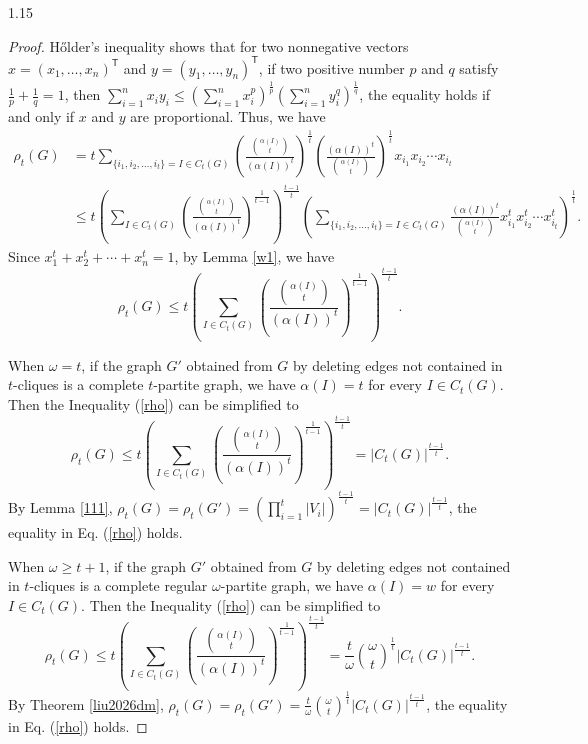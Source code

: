 \documentclass[preprint,12pt]{elsarticle1}
\numberwithin{equation}{section}
\begin{document}
\begin{spacing}{1.15}
\begin{proof}
H\H{o}lder's inequality shows that for two nonnegative vectors $x=(x_1,\ldots,x_n)^{\mathsf{T}}$ and $y=(y_1,\ldots,y_n)^{\mathsf{T}}$, if two positive number $p$ and $q$ satisfy $\frac{1}{p}+\frac{1}{q}=1$, then $\sum_{i=1}^{n}x_i y_i\le \left(\sum_{i=1}^{n}x_i^p\right)^{\frac{1}{p}}\left(\sum_{i=1}^{n}y_i^q\right)^{\frac{1}{q}}$,
the equality holds if and only if $x$ and $y$ are proportional.
Thus, we have
\begin{align*}
\rho_{t}(G)&=t \sum_{\{i_1,i_2,\ldots,i_t\}=I\in C_t(G)} \left(\frac{\binom{\alpha(I)}{t}}{\left(\alpha(I)\right)^t}\right)^{\frac{1}{t}} \left(\frac{\left(\alpha(I)\right)^t}{\binom{\alpha(I)}{t}}\right)^{\frac{1}{t}}x_{i_1} x_{i_2} \cdots x_{i_t}\\
&\le t \left(\sum_{I\in C_t(G)}\left(\frac{\binom{\alpha(I)}{t}}{\left(\alpha(I)\right)^t}\right)^{\frac{1}{t-1}}\right)^{\frac{t-1}{t}} \left(\sum_{\{i_1,i_2,\ldots,i_t\}=I\in C_t(G)}\frac{\left(\alpha(I)\right)^t}{\binom{\alpha(I)}{t}}x_{i_1}^{t} x_{i_2}^{t}\cdots x_{i_t}^{t}\right)^{\frac{1}{t}}.
\end{align*}
Since $x_1^t+x_2^t+\cdots+x_n^t=1$, by Lemma \ref{w1}, we have
\begin{equation}\label{rho}
\rho_{t}(G)\le t \left(\sum_{I\in C_t(G)}\left(\frac{\binom{\alpha(I)}{t}}{\left(\alpha(I)\right)^t}\right)^{\frac{1}{t-1}}\right)^{\frac{t-1}{t}}.
\end{equation}

When $\omega = t$, if the graph $G'$ obtained from $G$ by deleting edges not contained in $t$-cliques is a complete $t$-partite graph, we have $\alpha(I)=t$ for every $I\in C_{t}(G)$. Then the Inequality (\ref{rho}) can be simplified to $$\rho_{t}(G)\le t \left(\sum_{I\in C_t(G)}\left(\frac{\binom{\alpha(I)}{t}}{\left(\alpha(I)\right)^t}\right)^{\frac{1}{t-1}}\right)^{\frac{t-1}{t}}=|C_t(G)|^{\frac{t-1}{t}}.$$
By Lemma \ref{111}, $\rho_t(G)=\rho_t(G')=\left( \prod_{i=1}^{t}|V_i| \right)^{\frac{t-1}{t}}=|C_t(G)|^{\frac{t-1}{t}}$, the equality in Eq. (\ref{rho}) holds.

When $\omega \geq t+1$, if the graph $G'$ obtained from $G$ by deleting edges not contained in $t$-cliques is a complete regular $\omega$-partite graph, we have $\alpha(I)=w$ for every $I\in C_{t}(G)$. Then the Inequality (\ref{rho}) can be simplified to $$\rho_{t}(G)\le t \left(\sum_{I\in C_t(G)}\left(\frac{\binom{\alpha(I)}{t}}{\left(\alpha(I)\right)^t}\right)^{\frac{1}{t-1}}\right)^{\frac{t-1}{t}}
=\frac{t}{\omega}\binom{\omega}{t}^{\frac{1}{t}}|C_{t}(G)|^{\frac{t-1}{t}}.$$ By Theorem \ref{liu2026dm}, $\rho_t(G)=\rho_t(G')=\frac{t}{\omega}\binom{\omega}{t}^{\frac{1}{t}}|C_{t}(G)|^{\frac{t-1}{t}}$, the equality in Eq. (\ref{rho}) holds.


\end{proof}
\end{spacing}
\end{document}
